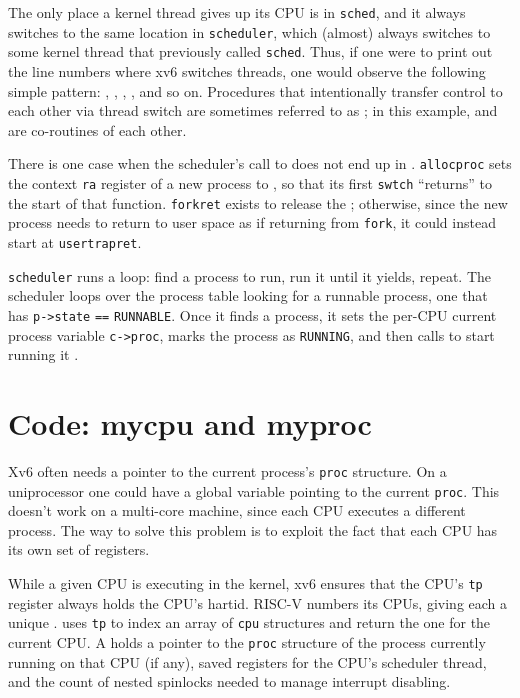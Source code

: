 The only place a kernel thread gives up its CPU is in
\lstinline{sched},
and it always switches to the same location in \lstinline{scheduler}, which
(almost) always switches to some kernel thread that previously called
\lstinline{sched}. 
Thus, if one were to print out the line numbers where xv6 switches
threads, one would observe the following simple pattern:
,
,
,
,
and so on.
Procedures that intentionally transfer control to each other via thread
switch are sometimes referred to as
; 
in this example,
and
are co-routines of each other.

There is one case when the scheduler's call to
does not end up in
.
\lstinline{allocproc} sets the context \lstinline{ra}
register of a new process to
,
so that its first \lstinline{swtch} ``returns'' 
to the start of that function.
\lstinline{forkret}
exists to release the 
;
otherwise, since the new process needs to
return to user space as if returning from \lstinline{fork},
it could instead start at
\lstinline{usertrapret}.

\lstinline{scheduler}
runs a loop:
find a process to run, run it until it yields, repeat.
The scheduler
loops over the process table
looking for a runnable process, one that has
\lstinline{p->state} 
\lstinline{==}
\lstinline{RUNNABLE}.
Once it finds a process, it sets the per-CPU current process
variable
\lstinline{c->proc},
marks the process as
\lstinline{RUNNING},
and then calls
to start running it
.


\section{Code: mycpu and myproc}

Xv6 often needs a pointer to the current process's \lstinline{proc}
structure. On a uniprocessor one could have a global variable pointing
to the current \lstinline{proc}. This doesn't work on a multi-core
machine, since each CPU executes a different process. The way to
solve this problem is to exploit the fact that each CPU has its own
set of registers.

While a given CPU is executing in the kernel, xv6 ensures that the CPU's \lstinline{tp}
register always holds the CPU's hartid.
RISC-V numbers its CPUs, giving each
a unique .
uses \lstinline{tp} to index an array
of \lstinline{cpu} structures and return the one
for the current CPU.
A
holds a pointer to the \lstinline{proc}
structure of
the process currently running
on that CPU (if any),
saved registers for the CPU's scheduler thread,
and the count of nested spinlocks needed to manage
interrupt disabling.

